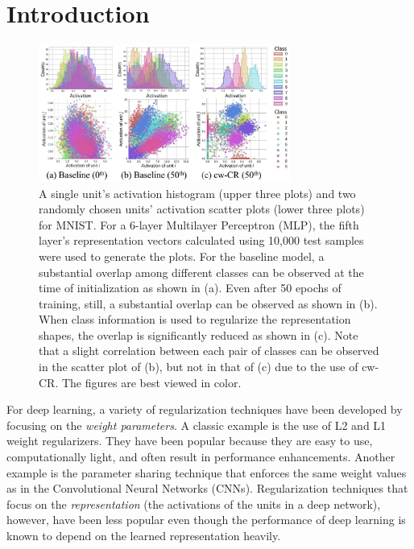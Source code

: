 \documentclass[letterpaper]{article} %
\begin{document}
\section{Introduction}
%

\begin{figure}[t]
\centering
\centerline{\includegraphics[width=8.25cm]{mnist_none_hist_scatter.pdf}}
\caption{
A single unit's activation histogram (upper three plots) and two randomly chosen units' activation scatter plots (lower three plots) for MNIST. For a 6-layer Multilayer Perceptron (MLP), the fifth layer's representation vectors calculated using 10,000 test samples were used to generate the plots. For the baseline model, a substantial overlap among different classes can be observed at the time of initialization as shown in (a). Even after 50 epochs of training, still, a substantial overlap can be observed as shown in (b). When class information is used to regularize the representation shapes, the overlap is significantly reduced as shown in (c). Note that a slight correlation between each pair of classes can be observed in the scatter plot of (b), but not in that of (c) due to the use of cw-CR. The figures are best viewed in color.
}
\label{fig:mnist_none_hist_scatter}
\end{figure}

For deep learning, a variety of regularization techniques have been developed by focusing on the \textit{weight parameters}. A classic example is the use of L2 \cite{hoerl1970ridge} and L1 \cite{tibshirani1996regression} weight regularizers. They have been popular because they are easy to use, computationally light, and often result in performance enhancements. Another example is the parameter sharing technique that enforces the same weight values as in the Convolutional Neural Networks (CNNs).  
Regularization techniques that focus on the \textit{representation} (the activations of the units in a deep network), however, have been less popular even though the performance of deep learning is known to depend on the learned representation heavily. 
\end{document}

